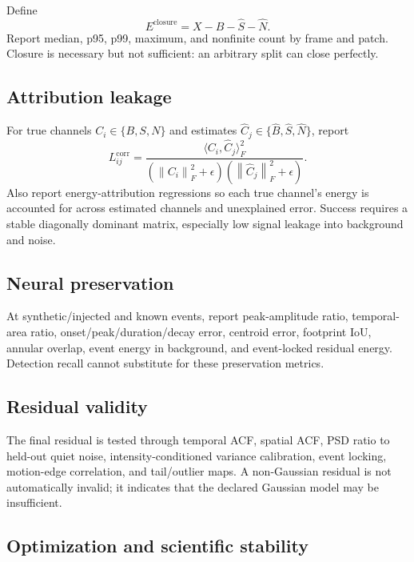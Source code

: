 \documentclass[11pt]{article}
\newcommand{\norm}[1]{\left\lVert #1\right\rVert}
\newcommand{\Bhat}{\widehat B}
\newcommand{\Shat}{\widehat S}
\newcommand{\Nhat}{\widehat N}
\begin{document}
Define
\begin{equation}
E^{\mathrm{closure}}=X-\Bhat-\Shat-\Nhat.
\end{equation}
Report median, p95, p99, maximum, and nonfinite count by frame and patch. Closure
is necessary but not sufficient: an arbitrary split can close perfectly.

\subsection{Attribution leakage}

For true channels \(C_i\in\{B,S,N\}\) and estimates
\(\widehat C_j\in\{\Bhat,\Shat,\Nhat\}\), report
\begin{equation}
L^{\mathrm{corr}}_{ij}=
\frac{\langle C_i,\widehat C_j\rangle_F^2}
{(\norm{C_i}_F^2+\epsilon)(\norm{\widehat C_j}_F^2+\epsilon)}.
\label{eq:leakage}
\end{equation}
Also report energy-attribution regressions so each true channel's energy is
accounted for across estimated channels and unexplained error. Success requires a
stable diagonally dominant matrix, especially low signal leakage into background
and noise.

\subsection{Neural preservation}

At synthetic/injected and known events, report peak-amplitude ratio, temporal-area
ratio, onset/peak/duration/decay error, centroid error, footprint IoU, annular
overlap, event energy in background, and event-locked residual energy. Detection
recall cannot substitute for these preservation metrics.

\subsection{Residual validity}

The final residual is tested through temporal ACF, spatial ACF, PSD ratio to
held-out quiet noise, intensity-conditioned variance calibration, event locking,
motion-edge correlation, and tail/outlier maps. A non-Gaussian residual is not
automatically invalid; it indicates that the declared Gaussian model may be
insufficient.

\subsection{Optimization and scientific stability}
\end{document}
